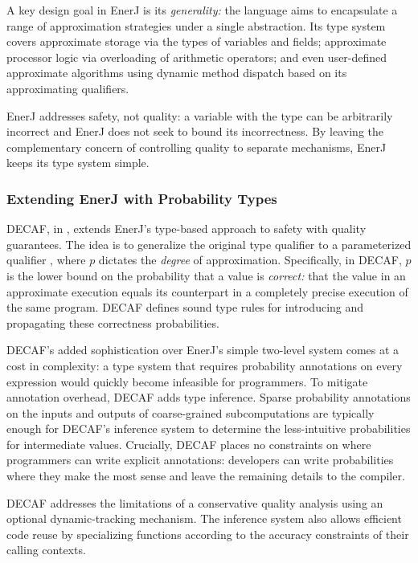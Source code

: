 A key design goal in EnerJ is its \emph{generality:}
the language aims to encapsulate a range of approximation strategies under a
single abstraction.
Its type system covers approximate storage via the types of variables and
fields;
approximate processor logic via overloading of arithmetic operators;
and even user-defined approximate algorithms using dynamic method dispatch
based on its approximating qualifiers.

EnerJ addresses safety, not quality:
a variable with the type  can be arbitrarily incorrect and
EnerJ does not seek to bound its incorrectness.
By leaving the complementary concern of controlling quality to separate
mechanisms, EnerJ keeps its type system simple.

\subsubsection{Extending EnerJ with Probability Types}

DECAF, in , extends EnerJ's type-based approach to safety with
quality guarantees.
The idea is to generalize the original  type qualifier to a
parameterized qualifier , where $p$ dictates the
\emph{degree} of approximation.
Specifically, in DECAF, $p$ is the lower bound on the probability that a value
is \emph{correct:} that the value in an approximate execution equals its
counterpart in a completely precise execution of the same program.
DECAF defines sound type rules for introducing and propagating these
correctness probabilities.

DECAF's added sophistication over EnerJ's simple two-level system comes at a
cost in complexity:
a type system that requires probability annotations on every expression
would quickly become infeasible for programmers.
To mitigate annotation overhead, DECAF adds type inference.
Sparse probability annotations on the inputs and outputs of coarse-grained
subcomputations are typically enough for DECAF's inference system to determine
the less-intuitive probabilities for intermediate values.
Crucially, DECAF places no constraints on where programmers can write explicit
annotations:
developers can write probabilities where they make the most sense and leave
the remaining details to the compiler.

DECAF addresses the limitations of a conservative quality analysis using
an optional dynamic-tracking mechanism.
The inference system also allows efficient code reuse by specializing
functions according to the accuracy constraints of their calling contexts.

